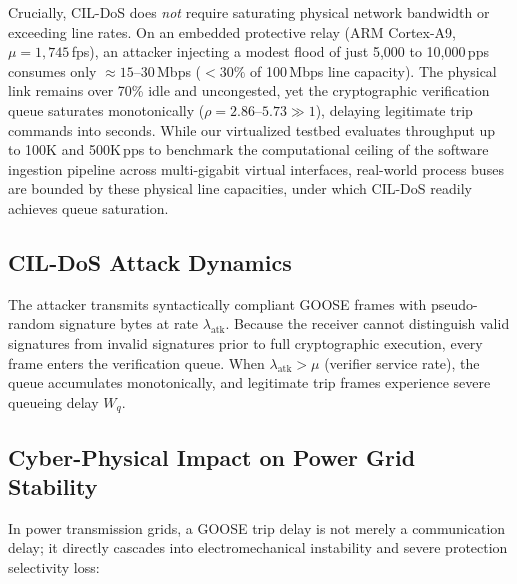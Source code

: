 \documentclass[journal]{IEEEtran}
\begin{document}
Crucially, CIL-DoS does \emph{not} require saturating physical network bandwidth or exceeding line rates. On an embedded protective relay (ARM Cortex-A9, $\mu = 1{,}745$\,fps), an attacker injecting a modest flood of just 5,000 to 10,000\,pps consumes only $\approx 15\text{--}30$\,Mbps ($<30\%$ of 100\,Mbps line capacity). The physical link remains over 70\% idle and uncongested, yet the cryptographic verification queue saturates monotonically ($\rho = 2.86\text{--}5.73 \gg 1$), delaying legitimate trip commands into seconds. While our virtualized testbed evaluates throughput up to 100K and 500K\,pps to benchmark the computational ceiling of the software ingestion pipeline across multi-gigabit virtual interfaces, real-world process buses are bounded by these physical line capacities, under which CIL-DoS readily achieves queue saturation.

\subsection{CIL-DoS Attack Dynamics}
The attacker transmits syntactically compliant GOOSE frames with pseudo-random signature bytes at rate $\lambda_{\text{atk}}$. Because the receiver cannot distinguish valid signatures from invalid signatures prior to full cryptographic execution, every frame enters the verification queue. When $\lambda_{\text{atk}} > \mu$ (verifier service rate), the queue accumulates monotonically, and legitimate trip frames experience severe queueing delay $W_q$.

\subsection{Cyber-Physical Impact on Power Grid Stability}
\label{sec:cyber_physical}
In power transmission grids, a GOOSE trip delay is not merely a communication delay; it directly cascades into electromechanical instability and severe protection selectivity loss:
\end{document}

